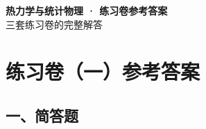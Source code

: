 \documentclass[12pt,a4paper,fontset=mac]{ctexart}
\newcommand{\đ}{\mathrm{đ}}
\begin{document}
\begin{center}
{\LARGE \textbf{热力学与统计物理 · 练习卷参考答案}}\\[0.5em]
{\normalsize 三套练习卷的完整解答}
\end{center}

\vspace{1em}

\section*{练习卷（一）参考答案}

\subsection*{一、简答题}
\end{document}
